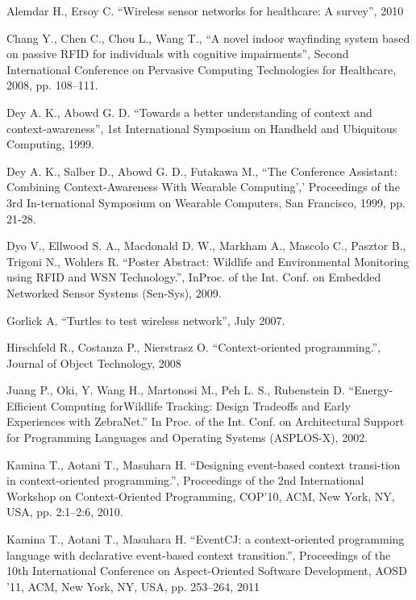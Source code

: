 \documentclass[12pt,a4paper]{article}
\begin{document}
\newpage
\begin{thebibliography}{9}

  Alemdar H., Ersoy C. ``Wireless sensor networks for healthcare: A survey'', 2010

   Chang Y., Chen C., Chou L., Wang T., ``A novel indoor wayfinding system based on passive RFID for individuals with cognitive impairments'', Second International Conference on Pervasive Computing Technologies for Healthcare, 2008, pp. 108–111.

  Dey A. K., Abowd G. D. ``Towards a better understanding of context and context-awareness'', 1st International Symposium on Handheld and Ubiquitous Computing, 1999.

  Dey A. K., Salber D., Abowd G. D., Futakawa M., ``The Conference Assistant: Combining Context-Awareness With Wearable Computing',' Proceedings of the 3rd In-ternational Symposium  on Wearable Computers, San Francisco, 1999, pp. 21-28.

  Dyo V., Ellwood S. A., Macdonald D. W., Markham A., Mascolo C., Pasztor B., Trigoni N., Wohlers R. ``Poster Abstract: Wildlife and Environmental Monitoring using RFID and WSN Technology.'', InProc. of the Int. Conf. on Embedded Networked Sensor Systems (Sen-Sys), 2009.

  Gorlick A. ``Turtles to test wireless network'', July 2007.

  Hirschfeld R., Costanza P., Nierstrasz O. ``Context-oriented programming.'', Journal of Object Technology, 2008

  Juang P., Oki, Y. Wang H., Martonosi M., Peh L. S., Rubenstein D. ``Energy-Efficient Computing forWildlife Tracking: Design Tradeoffs and Early Experiences with ZebraNet.'' In Proc. of the Int. Conf. on Architectural Support for Programming Languages and Operating Systems (ASPLOS-X), 2002.
  
  Kamina T., Aotani T., Masuhara H. ``Designing  event-based  context  transi-tion  in  context-oriented  programming.'', Proceedings of the 2nd International Workshop on Context-Oriented Programming, COP’10, ACM, New York, NY, USA, pp. 2:1–2:6, 2010.
  
  Kamina T., Aotani T., Masuhara H. ``EventCJ:  a  context-oriented  programming language  with  declarative  event-based  context  transition.'', Proceedings  of the  10th  International  Conference  on  Aspect-Oriented  Software  Development,
AOSD  ’11,  ACM,  New  York,  NY,  USA,  pp.  253–264, 2011


\end{thebibliography}
\end{document}
